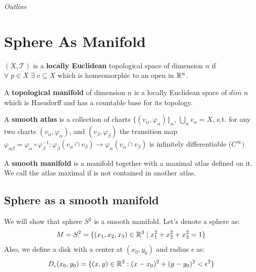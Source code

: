 \documentclass[11pt,a4paper]{report}
\begin{document}
\textit{Outline} \newline

\chapter{Sphere As Manifold}
\begin{defn}
     $(X,\mathcal{T})$ is a \textbf{locally Euclidean} topological space of dimension $n$  if $\forall \; p \in X \; \exists \; v \subseteq X$ which is homeomorphic to an open in $\mathbb{R}^n$.
\end{defn}
\begin{defn}
      A \textbf{topological manifold} of dimension $n$ is a locally Euclidean space of $dim$ $n$ which is Hasudorff and has a countable base for its topology.
\end{defn}
\begin{defn}
      A \textbf{smooth atlas} is a collection of charts $\{ (v_{\alpha}, \varphi_{\alpha}) \}_{\alpha}$, $\bigcup_{\alpha} v_{\alpha} = X$, s.t. for any two charts $(v_{\alpha} , \varphi_{\alpha})$, and $(v_{\beta} , \varphi_{\beta})$
      the transition map $\varphi_{\alpha \beta} = \varphi_{\alpha} \circ \varphi_{\beta}^{-1} : \varphi_{\beta}(v_{\alpha} \cap v_{\beta}) \to \varphi_{\alpha}(v_{\alpha} \cap v_{\beta})$ is infinitely differentiable ($C^{\infty})$
\end{defn}
\begin{defn}
  A \textbf{smooth manifold} is a manifold together with a maximal atlas defined on it. We call the atlas maximal if is not contained in another atlas.
\end{defn}
\section{Sphere as a smooth manifold}
We will show that sphere $S^2$ is a smooth manifold. Let's denote a sphere as:
\begin{equation} \label{s2}
 M = S^2 = \{(x_1,x_2,x_3) \in \mathbb{R}^3 \mid x_1^2 + x_2^2 + x_3^2 = 1 \} 
\end{equation}
Also, we define a disk with a center at $(x_0,y_0)$ and radius $\epsilon$ as:
$$ D_{\epsilon}(x_0,y_0) = \{(x,y) \in \mathbb{R}^2 : (x-x_0)^2 + (y-y_0)^2 < \epsilon^2 \} $$
\end{document}
